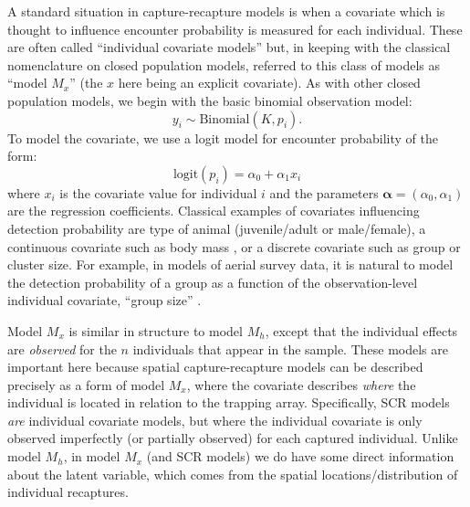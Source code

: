 A standard situation in capture-recapture models is when a covariate
which is thought to influence encounter probability is measured for
each individual. These are often called ``individual covariate
models'' but, in keeping with 
the classical nomenclature on closed
population models, \citet{kery_schaub:2011} 
referred to this class of models as ``model $M_{x}$'' (the $x$ here
being an explicit covariate).
 As with other closed population models, we begin
with the basic binomial observation model:
\[
y_{i} \sim \mbox{Binomial}(K, p_{i}).
\]
To model the covariate, we use a logit model for encounter probability
of the form:
\begin{equation}
 \mbox{logit}(p_{i}) = \alpha_0 + \alpha_1 x_{i}
\label{closed.eq.ha}
\end{equation}
where $x_i$ is the covariate value for individual $i$ and the
parameters $\bm{\alpha}= (\alpha_0, \alpha_1)$ are the regression coefficients. Classical
examples of covariates influencing detection probability are type of
animal (juvenile/adult or male/female), a continuous covariate such as
body mass \citep[e.g.,][Chapt. 6]{royle_dorazio:2008}, or a discrete covariate
such as group or cluster size. For example, in models of aerial survey
data, it is natural to model the detection probability of a group as a
function of the observation-level individual covariate, ``group size''
\citep{royle:2008, royle:2009, langtimm_etal:2011}.

Model $M_{x}$ is similar in structure to model
$M_{h}$, except that the individual effects are {\it observed} for the
$n$ individuals that appear in the sample. These models are important
here because spatial capture-recapture models can be described
precisely as a form of model $M_{x}$, where the covariate
describes {\it where} the individual is located in relation to the
trapping array.  Specifically, SCR models {\it are} individual
covariate models, but where the
individual covariate is only observed imperfectly (or partially
observed) for each 
captured individual.  Unlike model $M_h$, in model $M_{x}$
 (and SCR models) we do have some direct information about the
latent variable, which comes from the spatial locations/distribution
of individual recaptures.

